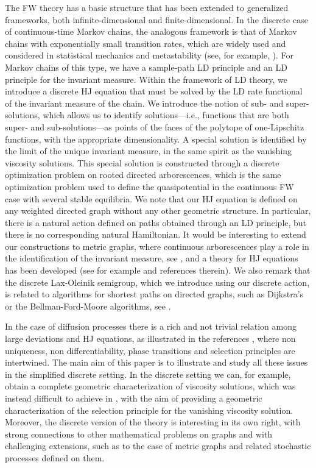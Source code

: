 \documentclass[reqno]{amsart}
\theoremstyle{plain}
\theoremstyle{definition}
\theoremstyle{remark}
\numberwithin{equation}{section}
\numberwithin{theorem}{section}
\newcommand{\<}{\langle}
\renewcommand{\>}{\rangle}
\begin{document}
\smallskip


The FW theory has a basic structure that has been extended to generalized frameworks, both infinite-dimensional and finite-dimensional. In the discrete case of continuous-time Markov chains, the analogous framework is that of Markov chains with exponentially small transition rates, which are widely used and considered in statistical mechanics and metastability (see, for example, \cite{OS1, OS2, S1, S2, S3}). For Markov chains of this type, we have a sample-path LD principle and an LD principle for the invariant measure. Within the framework of LD theory, we introduce a discrete HJ equation that must be solved by the LD rate functional of the invariant measure of the chain. We introduce the notion of sub- and super-solutions, which allows us to identify solutions—i.e., functions that are both super- and sub-solutions—as points of the faces of the polytope of one-Lipschitz functions, with the appropriate dimensionality. A special solution is identified by the limit of the unique invariant measure, in the same spirit as the vanishing viscosity solutions. This special solution is constructed through a discrete optimization problem on rooted directed arborescences, which is the same optimization problem used to define the quasipotential in the continuous FW case with several stable equilibria. We note that our HJ equation is defined on any weighted directed graph without any other geometric structure. In particular, there is a natural action defined on paths obtained through an LD principle, but there is no corresponding natural Hamiltonian. It would be interesting to extend our constructions to metric graphs, where continuous arborescences play a role in the identification of the invariant measure, see \cite{ACG}, and a theory for HJ equations has been developed (see for example \cite{CM} and references therein). We also remark that the discrete Lax-Oleinik semigroup, which we introduce using our discrete action, is related to algorithms for shortest paths on directed graphs, such as Dijkstra's or the Bellman-Ford-Moore algorithms, see \cite{JJ}.

In the case of diffusion processes there is a rich and not trivial relation among large deviations and HJ equations, as illustrated in the references \cite{FG,GL,GT,J}, where non uniqueness, non differentiability, phase transitions and selection principles are intertwined. The main aim of this paper is to illustrate and study all these issues in the simplified discrete setting. In the discrete setting we can, for example, obtain a complete geometric characterization of viscosity solutions, which was instead difficult to achieve in \cite{FG}, with the aim of providing a geometric characterization of the selection principle for the vanishing viscosity solution. Moreover, the discrete version of the theory is interesting in its own right, with strong connections to other mathematical problems on graphs and with challenging extensions, such as to the case of metric graphs and related stochastic processes defined on them.
\end{document}
